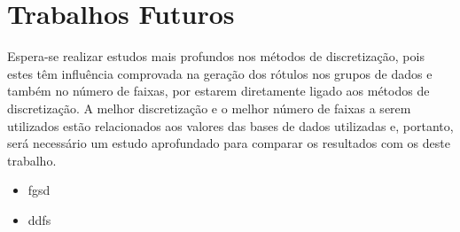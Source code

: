 



\section{Trabalhos Futuros}\label{cap:fut}



Espera-se realizar estudos mais profundos nos métodos de discretização, pois estes têm influência comprovada na geração dos rótulos nos grupos de dados e também no número de faixas, por estarem diretamente ligado aos métodos de discretização. A melhor discretização e o melhor número de faixas a serem utilizados estão relacionados aos valores das bases de dados utilizadas e, portanto, será necessário um estudo aprofundado para comparar os resultados com os deste trabalho. 



\begin{itemize}
 \item fgsd
 \item ddfs
\end{itemize}


